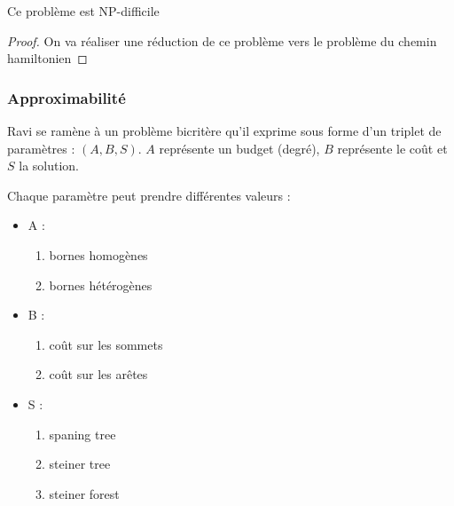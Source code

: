 \documentclass[a4paper,11pt]{thesis}
\begin{document}

\begin{prop}
    Ce problème est NP-difficile
\end{prop}

\begin{proof}
    On va réaliser une réduction de ce problème vers le problème du chemin hamiltonien
\end{proof}

\subsubsection{Approximabilit\'{e}}

Ravi se ramène à un problème bicritère qu'il exprime sous forme d'un triplet de paramètres : $(A, B,
S)$. $A$ représente un budget (degré), $B$ représente le coût et $S$ la solution.

Chaque paramètre peut prendre différentes valeurs :
\begin{itemize}
    \item A : \begin{enumerate}
            \item bornes homogènes
            \item bornes hétérogènes
        \end{enumerate}
    \item B : \begin{enumerate}
            \item coût sur les sommets
            \item coût sur les arêtes
        \end{enumerate}
    \item S : \begin{enumerate}
            \item spaning tree
            \item steiner tree
            \item steiner forest
        \end{enumerate}
\end{itemize}
\end{document}
